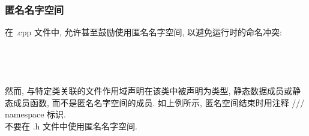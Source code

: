 \documentclass[a4paper,11pt,CJK]{article}
\begin{document}
\begin{CJK}{UTF8}{gbsn}
\subsubsection{匿名名字空间}
在 .cpp 文件中, 允许甚至鼓励使用匿名名字空间, 以避免运行时的命名冲突: \\
\\
\noindent
{}
\\
\\
\\
\indent 然而, 与特定类关联的文件作用域声明在该类中被声明为类型, 静态数据成员或静态成员函数, 而不是匿名名字空间的成员. 如上例所示, 匿名空间结束时用注释 /// namespace 标识. \\
\indent 不要在 .h 文件中使用匿名名字空间. \\


\end{CJK}
\end{document}
